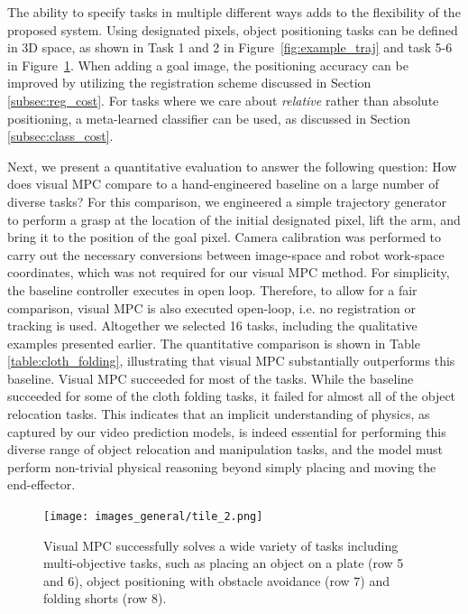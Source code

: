 The ability to specify tasks in multiple different ways adds to the flexibility of the proposed system. Using designated pixels, object positioning tasks can be defined in 3D space, as shown in Task 1 and 2 in Figure~\ref{fig:example_traj} and task 5-6 in Figure~\ref{fig:tile_2}. When adding a goal image, the positioning accuracy can be improved by utilizing the registration scheme discussed in Section \ref{subsec:reg_cost}.
For tasks where we care about \emph{relative} rather than absolute positioning, a meta-learned classifier can be used, as discussed in Section \ref{subsec:class_cost}.

Next, we present a quantitative evaluation to answer the following question: How does visual MPC compare to a hand-engineered baseline on a large number of diverse tasks? For this comparison, we engineered a simple trajectory generator to perform a grasp at the location of the initial designated pixel, lift the arm, and bring it to the position of the goal pixel. Camera calibration was performed to carry out the necessary conversions between image-space and robot work-space coordinates, which was not required for our visual MPC method. For simplicity, the baseline controller executes in open loop. Therefore, to allow for a fair comparison, visual MPC is also executed open-loop, i.e. no registration or tracking is used.
Altogether we selected 16 tasks, including the qualitative examples presented earlier.
The quantitative comparison is shown in Table \ref{table:cloth_folding}, illustrating that visual MPC substantially outperforms this baseline.
Visual MPC succeeded for most of the tasks. While the baseline succeeded for some of the cloth folding tasks, it failed for almost all of the object relocation tasks. This indicates that an implicit understanding of physics, as captured by our video prediction models, is indeed essential for performing this diverse range of object relocation and manipulation tasks, and the model must perform non-trivial physical reasoning beyond simply placing and moving the end-effector.


\begin{figure}
	\centering
	\texttt{[image: images\_general/tile\_2.png]}
	\caption{Visual MPC successfully solves a wide variety of tasks including multi-objective tasks, such as placing an object on a plate (row 5 and 6), object positioning with obstacle avoidance (row 7) and folding shorts (row 8).   
		\label{fig:tile_2}}
\end{figure}

